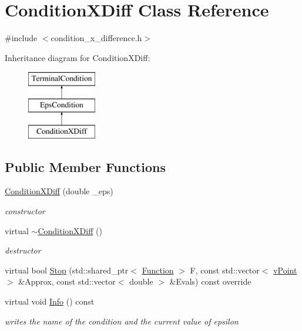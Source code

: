\hypertarget{class_condition_x_diff}{}\section{Condition\+X\+Diff Class Reference}
\label{class_condition_x_diff}


{\ttfamily \#include $<$condition\+\_\+x\+\_\+difference.\+h$>$}

Inheritance diagram for Condition\+X\+Diff\+:\begin{figure}[H]
\begin{center}
\leavevmode
\includegraphics[height=3.000000cm]{class_condition_x_diff}
\end{center}
\end{figure}
\subsection*{Public Member Functions}
\begin{DoxyCompactItemize}
\item 
\mbox{\label{class_condition_x_diff_a9a4c11adfbc93943c02c5ad778792467}} 
\hyperlink{class_condition_x_diff_a9a4c11adfbc93943c02c5ad778792467}{Condition\+X\+Diff} (double \+\_\+eps)
\begin{DoxyCompactList}\small\item\em constructor \end{DoxyCompactList}\item 
\mbox{\label{class_condition_x_diff_addb0a5448d4424e8bdacc31a0674b0b5}} 
virtual \hyperlink{class_condition_x_diff_addb0a5448d4424e8bdacc31a0674b0b5}{$\sim$\+Condition\+X\+Diff} ()
\begin{DoxyCompactList}\small\item\em destructor \end{DoxyCompactList}\item 
virtual bool \hyperlink{class_condition_x_diff_a375e80eb4b88db5c2823a7d4efe20972}{Stop} (std\+::shared\+\_\+ptr$<$ \hyperlink{class_function}{Function} $>$ F, const std\+::vector$<$ \hyperlink{classv_point}{v\+Point} $>$ \&Approx, const std\+::vector$<$ double $>$ \&Evals) const override
\item 
\mbox{\label{class_condition_x_diff_a90e346147a31dafdf5e79809efc6babd}} 
virtual void \hyperlink{class_condition_x_diff_a90e346147a31dafdf5e79809efc6babd}{Info} () const
\begin{DoxyCompactList}\small\item\em writes the name of the condition and the current value of epsilon \end{DoxyCompactList}\end{DoxyCompactItemize}
